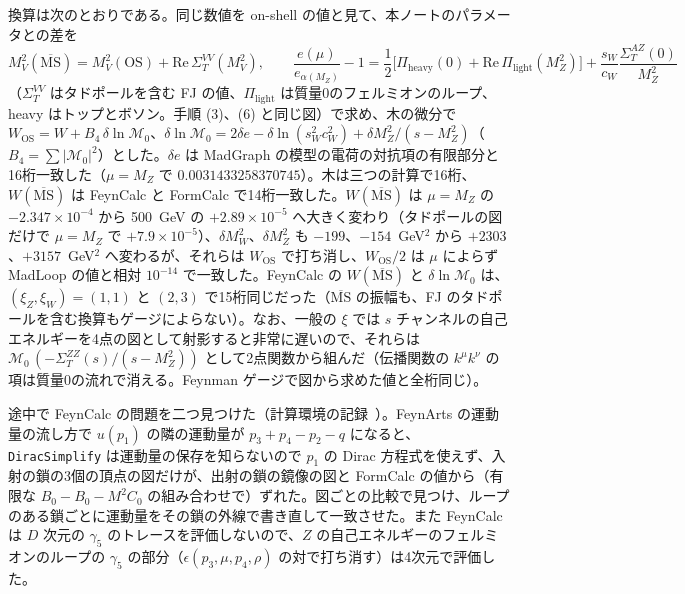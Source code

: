 \documentclass[a4paper,10pt]{ltjsarticle}
\newcommand{\MSbar}{\overline{\mathrm{MS}}}
\newcommand{\re}{\mathrm{Re}\,}
\begin{document}
換算は次のとおりである。同じ数値を on-shell の値と見て、本ノートのパラメータとの差を
\begin{equation}
M_V^2(\MSbar)=M_V^2(\mathrm{OS})+\re\Sigma_T^{VV}(M_V^2),\qquad
\frac{e(\mu)}{e_{\alpha(M_Z)}}-1=\frac12\bigl[\Pi_{\mathrm{heavy}}(0)+\re\Pi_{\mathrm{light}}(M_Z^2)\bigr]+\frac{s_W}{c_W}\frac{\Sigma_T^{AZ}(0)}{M_Z^2}
\label{eq:convOS}
\end{equation}
（$\Sigma_T^{VV}$ はタドポールを含む FJ の値、$\Pi_{\mathrm{light}}$ は質量0のフェルミオンのループ、heavy はトップとボソン。手順 (3)、(6) と同じ図）で求め、木の微分で $W_{\mathrm{OS}}=W+B_4\,\delta\ln\mathcal M_0$、$\delta\ln\mathcal M_0=2\delta e-\delta\ln(s_W^2c_W^2)+\delta M_Z^2/(s-M_Z^2)$（$B_4=\sum|\mathcal M_0|^2$）とした。$\delta e$ は MadGraph の模型の電荷の対抗項の有限部分と16桁一致した（$\mu=M_Z$ で $0.0031433258370745$）。木は三つの計算で16桁、$W(\MSbar)$ は FeynCalc と FormCalc で14桁一致した。$W(\MSbar)$ は $\mu=M_Z$ の $-2.347\times10^{-4}$ から 500~GeV の $+2.89\times10^{-5}$ へ大きく変わり（タドポールの図だけで $\mu=M_Z$ で $+7.9\times10^{-5}$）、$\delta M_W^2$、$\delta M_Z^2$ も $-199$、$-154$~GeV$^2$ から $+2303$、$+3157$~GeV$^2$ へ変わるが、それらは $W_{\mathrm{OS}}$ で打ち消し、$W_{\mathrm{OS}}/2$ は $\mu$ によらず MadLoop の値と相対 $10^{-14}$ で一致した。FeynCalc の $W(\MSbar)$ と $\delta\ln\mathcal M_0$ は、$(\xi_Z,\xi_W)=(1,1)$ と $(2,3)$ で15桁同じだった（$\MSbar$ の振幅も、FJ のタドポールを含む換算もゲージによらない）。なお、一般の $\xi$ では $s$ チャンネルの自己エネルギーを4点の図として射影すると非常に遅いので、それらは $\mathcal M_0\,(-\Sigma_T^{ZZ}(s)/(s-M_Z^2))$ として2点関数から組んだ（伝播関数の $k^\mu k^\nu$ の項は質量0の流れで消える。Feynman ゲージで図から求めた値と全桁同じ）。

途中で FeynCalc の問題を二つ見つけた（計算環境の記録~\cite{env}）。FeynArts の運動量の流し方で $u(p_1)$ の隣の運動量が $p_3+p_4-p_2-q$ になると、\texttt{DiracSimplify} は運動量の保存を知らないので $p_1$ の Dirac 方程式を使えず、入射の鎖の3個の頂点の図だけが、出射の鎖の鏡像の図と FormCalc の値から（有限な $B_0-B_0-M^2C_0$ の組み合わせで）ずれた。図ごとの比較で見つけ、ループのある鎖ごとに運動量をその鎖の外線で書き直して一致させた。また FeynCalc は $D$ 次元の $\gamma_5$ のトレースを評価しないので、$Z$ の自己エネルギーのフェルミオンのループの $\gamma_5$ の部分（$\epsilon(p_3,\mu,p_4,\rho)$ の対で打ち消す）は4次元で評価した。
\end{document}
